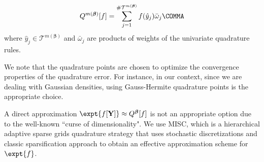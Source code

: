 $$ Q^{m(\boldsymbol{\beta})}[f]= \sum_{j=1}^{\#\mathcal{T}^{m(\boldsymbol{\beta})}} f(\hat{y}_j) \bar{\omega}_j \COMMA$$
where $\hat{y}_j \in \mathcal{T}^{m(\boldsymbol{\beta})}$ and $\bar{\omega}_j$ are  products of weights of the univariate quadrature rules.
\begin{remark}
	We note that the quadrature points are chosen to optimize the convergence properties of the quadrature error.  For instance, in our context, since we are dealing with Gaussian densities, using Gauss-Hermite quadrature points is the appropriate choice.
\end{remark}
A direct approximation $\expt{f[\mathbf{Y}]} \approx Q^{\boldsymbol{\beta}}[f]$ is not an appropriate option  due to the well-known ``curse of dimensionality". We use MISC, which is a hierarchical adaptive sparse grids quadrature strategy that uses  stochastic discretizations  and classic sparsification approach to obtain an effective approximation scheme for $\expt{f}$. 

